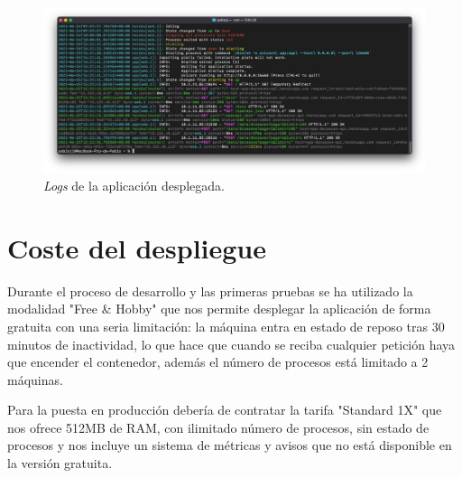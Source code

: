 \FloatBarrier
\begin{figure}[h]
	\centering	
	\includegraphics[width=\textwidth]{doc/logos/imgs/logs.jpg}
	\caption{ \textit{Logs} de la aplicación desplegada. }
    \label{fig:heroku-logs}
\end{figure}
\FloatBarrier

\section{Coste del despliegue}
\label{sec:despliegue}

Durante el proceso de desarrollo y las primeras pruebas se ha utilizado la modalidad "Free
\& Hobby" que nos permite desplegar la aplicación de forma gratuita con una seria
limitación: la máquina entra en estado de reposo tras 30 minutos de inactividad, lo que
hace que cuando se reciba cualquier petición haya que encender el contenedor, además el
número de procesos está limitado a 2 máquinas.

Para la puesta en producción debería de contratar la tarifa "Standard 1X" que nos ofrece
512MB de RAM, con ilimitado número de procesos, sin estado de procesos y nos incluye un
sistema de métricas y avisos que no está disponible en la versión gratuita.
